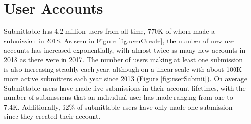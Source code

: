 \documentclass[]{report}   %
\begin{document}
\section{User Accounts}
Submittable has 4.2 million users from all time, 770K of whom made a submission in 2018. As seen in Figure \ref{fig:userCreate}, the number of new user accounts has increased exponentially, with almost twice as many new accounts in 2018 as there were in 2017. The number of users making at least one submission is also increasing steadily each year, although on a linear scale with about 100K more active submitters each year since 2013 (Figure \ref{fig:userSubmit}). On average Submittable users have made five submissions in their account lifetimes, with the number of submissions that an individual user has made ranging from one to 7.4K. Additionally, 62\% of submittable users have only made one submission since they created their account.
\end{document}
